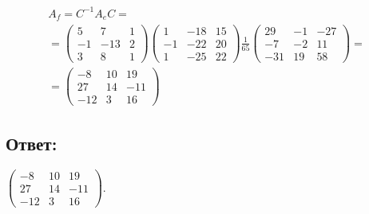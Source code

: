 \documentclass[12pt]{article}
\begin{document}
    \begin{multline*}
        A_f
        = C^{-1} A_e C = \\
        = \begin{pmatrix}
              5  & 7   & 1 \\
              -1 & -13 & 2 \\
              3  & 8   & 1
        \end{pmatrix}
        \begin{pmatrix}
            1  & - 18 & 15 \\
            -1 & -22  & 20 \\
            1  & -25  & 22
        \end{pmatrix}
        \frac{1}{65}
        \begin{pmatrix}
            29  & -1 & -27 \\
            -7  & -2 & 11  \\
            -31 & 19 & 58
        \end{pmatrix} = \\
        =
        \begin{pmatrix}
            -8  & 10 & 19  \\
            27  & 14 & -11 \\
            -12 & 3  & 16
        \end{pmatrix}
    \end{multline*}

    \subsection*{Ответ:}
    $
    \begin{pmatrix}
        -8  & 10 & 19  \\
        27  & 14 & -11 \\
        -12 & 3  & 16
    \end{pmatrix}
    $.
\end{document}

